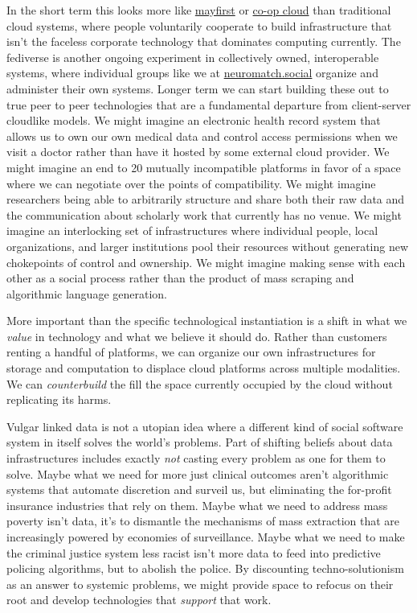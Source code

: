 \documentclass{article}
\begin{document}
In the short term this looks more like
\href{https://mayfirst.coop/en/}{mayfirst} or
\href{https://coopcloud.tech/}{co-op cloud} than traditional cloud
systems, where people voluntarily cooperate to build infrastructure that
isn't the faceless corporate technology that dominates computing
currently. The fediverse is another ongoing experiment in collectively
owned, interoperable systems, where individual groups like we at
\href{https://neuromatch.social}{neuromatch.social} organize and
administer their own systems. Longer term we can start building these
out to true peer to peer technologies that are a fundamental departure
from client-server cloudlike models. We might imagine an electronic
health record system that allows us to own our own medical data and
control access permissions when we visit a doctor rather than have it
hosted by some external cloud provider. We might imagine an end to 20
mutually incompatible platforms in favor of a space where we can
negotiate over the points of compatibility. We might imagine researchers
being able to arbitrarily structure and share both their raw data and
the communication about scholarly work that currently has no venue. We
might imagine an interlocking set of infrastructures where individual
people, local organizations, and larger institutions pool their
resources without generating new chokepoints of control and ownership.
We might imagine making sense with each other as a social process rather
than the product of mass scraping and algorithmic language generation.

More important than the specific technological instantiation is a shift
in what we \emph{value} in technology and what we believe it should do.
Rather than customers renting a handful of platforms, we can organize
our own infrastructures for storage and computation to displace cloud
platforms across multiple modalities. We can \emph{counterbuild} the
fill the space currently occupied by the cloud without replicating its
harms.

Vulgar linked data is not a utopian idea where a different kind of
social software system in itself solves the world's problems. Part of
shifting beliefs about data infrastructures includes exactly \emph{not}
casting every problem as one for them to solve. Maybe what we need for
more just clinical outcomes aren't algorithmic systems that automate
discretion and surveil us, but eliminating the for-profit insurance
industries that rely on them. Maybe what we need to address mass poverty
isn't data, it's to dismantle the mechanisms of mass extraction that are
increasingly powered by economies of surveillance. Maybe what we need to
make the criminal justice system less racist isn't more data to feed
into predictive policing algorithms, but to abolish the police. By
discounting techno-solutionism as an answer to systemic problems, we
might provide space to refocus on their root and develop technologies
that \emph{support} that work.
\end{document}
